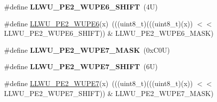 \begin{DoxyCompactItemize}
\#define {\bfseries L\+L\+W\+U\+\_\+\+P\+E2\+\_\+\+W\+U\+P\+E6\+\_\+\+S\+H\+I\+FT}~(4\+U)
\item 
\#define \mbox{\hyperlink{group___l_l_w_u___register___masks_gaa96b35faf789a4b85552957c8227c1e0}{L\+L\+W\+U\+\_\+\+P\+E2\+\_\+\+W\+U\+P\+E6}}(x)~(((uint8\+\_\+t)(((uint8\+\_\+t)(x)) $<$$<$ L\+L\+W\+U\+\_\+\+P\+E2\+\_\+\+W\+U\+P\+E6\+\_\+\+S\+H\+I\+FT)) \& L\+L\+W\+U\+\_\+\+P\+E2\+\_\+\+W\+U\+P\+E6\+\_\+\+M\+A\+SK)
\item 
\mbox{\label{group___l_l_w_u___register___masks_ga39b30f51fdd7f83bb5aa29bf2bc87c26}} 
\#define {\bfseries L\+L\+W\+U\+\_\+\+P\+E2\+\_\+\+W\+U\+P\+E7\+\_\+\+M\+A\+SK}~(0x\+C0\+U)
\item 
\mbox{\label{group___l_l_w_u___register___masks_ga82bfb99732d7f90dacdc01ef5222a59a}} 
\#define {\bfseries L\+L\+W\+U\+\_\+\+P\+E2\+\_\+\+W\+U\+P\+E7\+\_\+\+S\+H\+I\+FT}~(6\+U)
\item 
\#define \mbox{\hyperlink{group___l_l_w_u___register___masks_gaecb28f5285444e1576a192260d5c3048}{L\+L\+W\+U\+\_\+\+P\+E2\+\_\+\+W\+U\+P\+E7}}(x)~(((uint8\+\_\+t)(((uint8\+\_\+t)(x)) $<$$<$ L\+L\+W\+U\+\_\+\+P\+E2\+\_\+\+W\+U\+P\+E7\+\_\+\+S\+H\+I\+FT)) \& L\+L\+W\+U\+\_\+\+P\+E2\+\_\+\+W\+U\+P\+E7\+\_\+\+M\+A\+SK)
\end{DoxyCompactItemize}
